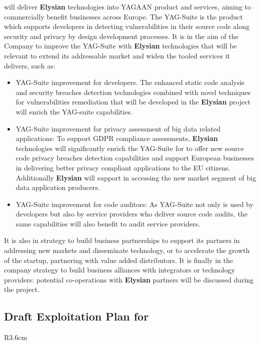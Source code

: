 \documentclass[a4paper,11pt]{article}
\newcommand{\project}[1]{\textbf{#1}\xspace}
\newcommand{\SECURITY}{\project{Elysian}}
\newcommand{\TheProject}{\SECURITY}
\begin{document}
 \YAGshort{} will deliver \TheProject technologies into YAGAAN product and services, aiming to commercially benefit businesses across Europe. The YAG-Suite is the \YAGshort{} product which supports developers in detecting vulnerabilities in their source code along security and privacy by design development processes. It is in the aim of the Company to improve the YAG-Suite with \TheProject technologies that will be relevant to extend its addressable market and widen the tooled services it delivers, such as:
\begin{itemize}
    \item YAG-Suite improvement for developers. The enhanced static code analysis and security breaches detection technologies combined with novel techniques for vulnerabilities remediation that will be developed in the \TheProject project will enrich the YAG-suite capabilities.
    \item YAG-Suite improvement for privacy assessment of big data related applications: To support GDPR compliance assessments, \TheProject technologies will significantly enrich the YAG-Suite for \YAGshort{} to offer new source code privacy breaches detection capabilities and support European businesses in delivering better privacy compliant applications to the EU citizens. Additionally \TheProject will support \YAGshort{} in accessing the new market segment of big data application producers.
    \item YAG-Suite improvement for code auditors: As YAG-Suite not only is used by developers but also by service providers who deliver source code audits, the same capabilities will also benefit to audit service providers.
\end{itemize}
It is also in \YAGshort{} strategy to build business partnerships to support its partners in addressing new markets and disseminate \YAGshort{} technology, or to accelerate the growth of the startup, partnering with value added distributors. It is finally in the company strategy to build business alliances with integrators or technology providers: potential co-operations with \TheProject{} partners will be discussed during the project.

\horizontalline

\subsection*{Draft Exploitation Plan for \COGNIshort{}}
\vspace{-6pt}

\begin{wrapfigure}{R}{3.6cm}
\vspace{-1.3cm}
\hfill {}
\vspace{-0.8cm}
\end{wrapfigure}
\end{document}
